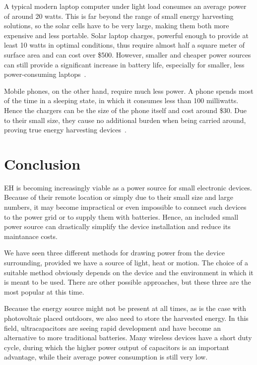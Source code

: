 \documentclass[a4paper,10pt]{article}
\begin{document}
A typical modern laptop computer under light load consumes an average power of around 20 watts. This is far beyond the range of small energy harvesting solutions, so the solar cells have to be very large, making them both more expensive and less portable. Solar laptop charges, powerful enough to provide at least 10 watts in optimal conditions, thus require almost half a square meter of surface area and can cost over \$500. However, smaller and cheaper power sources can still provide a significant increase in battery life, especially for smaller, less power-consuming laptops~\cite{news:laptop-chargers}. 

Mobile phones, on the other hand, require much less power. A phone spends most of the time in a sleeping state, in which it consumes less than 100 milliwatts. Hence the chargers can be the size of the phone itself and cost around \$30. Due to their small size, they cause no additional burden when being carried around, proving true energy harvesting devices~\cite{mysolarphonecharger}. 


\section{Conclusion}

\acf{EH} is becoming increasingly viable as a power source for small electronic devices. Because of their remote location or simply due to their small size and large numbers, it may become impractical or even impossible to connect such devices to the power grid or to supply them with batteries. Hence, an included small power source can drastically simplify the device installation and reduce its maintanace costs. 

We have seen three different methods for drawing power from the device surrounding, provided we have a source of light, heat or motion. The choice of a suitable method obviously depends on the device and the environment in which it is meant to be used. There are other possible approaches, but these three are the most popular at this time. 

Because the energy source might not be present at all times, as is the case with photovoltaic placed outdoors, we also need to store the harvested energy. In this field, ultracapacitors are seeing rapid development and have become an alternative to more traditional batteries. Many wireless devices have a short duty cycle, during which the higher power output of capacitors is an important advantage, while their average power consumption is still very low. 

\newpage


 
\end{document}
